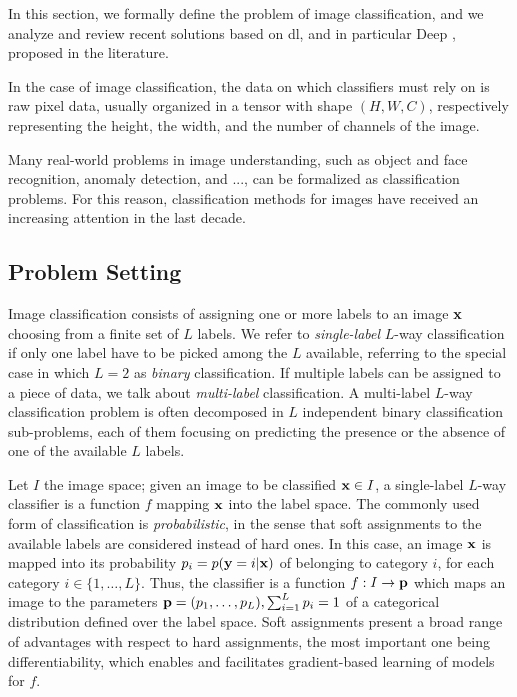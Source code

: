 In this section, we formally define the problem of image classification, and we analyze and review recent solutions based on \acrlong{dl}, and in particular Deep , proposed in the literature.

In the case of image classification, the data on which classifiers must rely on is raw pixel data, usually organized in a tensor with shape $(H, W, C)$, respectively representing the height, the width, and the number of channels of the image.

Many real-world problems in image understanding, such as object and face recognition, anomaly detection, and ..., can be formalized as classification problems.
For this reason, classification methods for images have received an increasing attention in the last decade.

\subsection{Problem Setting}
\label{subsec:back:classification}
Image classification consists of assigning one or more labels to an image $\mathbf{x}$ choosing from a finite set of $L$ labels.
We refer to \emph{single-label} $L$-way classification if only one label have to be picked among the $L$ available, referring to the special case in which $L=2$ as \emph{binary} classification.
If multiple labels can be assigned to a piece of data, we talk about \emph{multi-label} classification.
A multi-label $L$-way classification problem is often decomposed in $L$ independent binary classification sub-problems, each of them focusing on predicting the presence or the absence of one of the available $L$ labels.

Let $I$ the image space;
given an image to be classified $\mathbf{x} \in I$, a single-label $L$-way classifier is a function $f$ mapping $\mathbf{x}$ into the label space.
The commonly used form of classification is \emph{probabilistic}, in the sense that soft assignments to the available labels are considered instead of hard ones.
In this case, an image $\mathbf{x}$ is mapped into its probability $p_i = p(\mathbf{y} = i | \mathbf{x})$ of belonging to category $i$, for each category $i \in \{1, \dots, L\}$.
Thus, the classifier is a function $f: I \to \mathbf{p}$ which maps an image to the parameters $\mathbf{p} = (p_1, \ldots, p_L), \sum_{i=1}^L p_i = 1$ of a categorical distribution defined over the label space.
Soft assignments present a broad range of advantages with respect to hard assignments, the most important one being differentiability, which enables and facilitates gradient-based learning of models for $f$.

